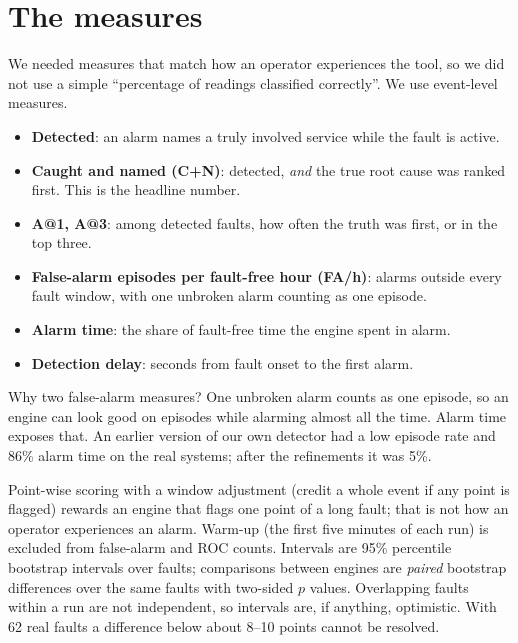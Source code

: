 \section{The measures}
\begin{simplebox}
We needed measures that match how an operator experiences the tool, so we did not use a simple ``percentage of readings classified correctly''. We use event-level measures.

\begin{itemize}
\item \textbf{Detected}: an alarm names a truly involved service while the fault is active.
\item \textbf{Caught and named (C+N)}: detected, \emph{and} the true root cause was ranked first. This is the headline number.
\item \textbf{A@1, A@3}: among detected faults, how often the truth was first, or in the top three.
\item \textbf{False-alarm episodes per fault-free hour (FA/h)}: alarms outside every fault window, with one unbroken alarm counting as one episode.
\item \textbf{Alarm time}: the share of fault-free time the engine spent in alarm.
\item \textbf{Detection delay}: seconds from fault onset to the first alarm.
\end{itemize}

Why two false-alarm measures? One unbroken alarm counts as one episode, so an engine can look good on episodes while alarming almost all the time. Alarm time exposes that. An earlier version of our own detector had a low episode rate and 86\% alarm time on the real systems; after the refinements it was 5\%.
\end{simplebox}

\begin{techbox}
Point-wise scoring with a window adjustment (credit a whole event if any point is flagged) rewards an engine that flags one point of a long fault; that is not how an operator experiences an alarm. Warm-up (the first five minutes of each run) is excluded from false-alarm and ROC counts. Intervals are 95\% percentile bootstrap intervals over faults; comparisons between engines are \emph{paired} bootstrap differences over the same faults with two-sided $p$ values. Overlapping faults within a run are not independent, so intervals are, if anything, optimistic. With 62 real faults a difference below about 8--10 points cannot be resolved.
\end{techbox}

